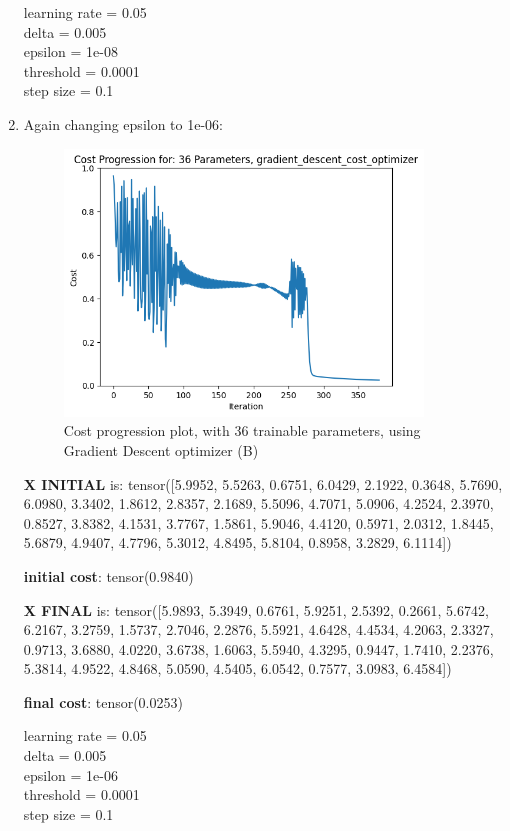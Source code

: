 \documentclass[inscr,ack,preface]{diphdthesis}
\begin{document}
\begin{enumerate}[label=\textbf{\Alph*.}]
    learning rate =  0.05 \\
    delta =  0.005 \\
    epsilon =  1e-08 \\
    threshold =  0.0001\\ 
    step size =  0.1 \\
    
    \item { }
    
    Again changing epsilon to 1e-06:
    
    \begin{figure}[H]
        \centering
        \includegraphics[width=0.9\textwidth]{epsilon06/36b.png}
        \caption{Cost progression plot, with 36 trainable parameters, using Gradient Descent optimizer (B)} 
        \label{fig:fig5}
    \end{figure}
    
    \textbf{X INITIAL}  is:
    tensor([5.9952, 5.5263, 0.6751, 6.0429, 2.1922, 0.3648, 5.7690, 6.0980, 3.3402,
            1.8612, 2.8357, 2.1689, 5.5096, 4.7071, 5.0906, 4.2524, 2.3970, 0.8527,
            3.8382, 4.1531, 3.7767, 1.5861, 5.9046, 4.4120, 0.5971, 2.0312, 1.8445,
            5.6879, 4.9407, 4.7796, 5.3012, 4.8495, 5.8104, 0.8958, 3.2829, 6.1114])
            
    \textbf{initial cost}:  tensor(0.9840)
    
    \textbf{X FINAL} is:
    tensor([5.9893, 5.3949, 0.6761, 5.9251, 2.5392, 0.2661, 5.6742, 6.2167, 3.2759,
            1.5737, 2.7046, 2.2876, 5.5921, 4.6428, 4.4534, 4.2063, 2.3327, 0.9713,
            3.6880, 4.0220, 3.6738, 1.6063, 5.5940, 4.3295, 0.9447, 1.7410, 2.2376,
            5.3814, 4.9522, 4.8468, 5.0590, 4.5405, 6.0542, 0.7577, 3.0983, 6.4584])
    
    \textbf{final cost}:  tensor(0.0253)
    
    learning rate =  0.05 \\
    delta =  0.005 \\
    epsilon =  1e-06 \\
    threshold =  0.0001 \\
    step size =  0.1 \\
    
\end{enumerate}
\end{document}
